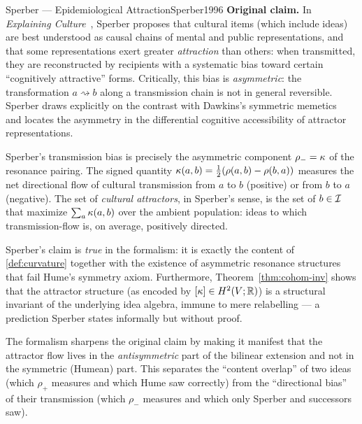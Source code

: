 \begin{zooentry}{Sperber --- Epidemiological Attraction}{Sperber1996}
\textbf{Original claim.} In \emph{Explaining Culture}~\cite{Sperber1996},
Sperber proposes that cultural items (which include ideas) are best
understood as causal chains of mental and public representations, and that
some representations exert greater \emph{attraction} than others: when
transmitted, they are reconstructed by recipients with a systematic bias
toward certain ``cognitively attractive'' forms. Critically, this bias is
\emph{asymmetric}: the transformation $a\rightsquigarrow b$ along a
transmission chain is not in general reversible. Sperber draws explicitly
on the contrast with Dawkins's symmetric memetics~\cite{Dawkins1976} and
locates the asymmetry in the differential cognitive accessibility of
attractor representations.

\formalclaim
Sperber's transmission bias is precisely the asymmetric component
$\rho_-=\kappa$ of the resonance pairing. The signed quantity
$\kappa(a,b)=\tfrac12(\rho(a,b)-\rho(b,a))$ measures the net directional
flow of cultural transmission from $a$ to $b$ (positive) or from $b$ to
$a$ (negative). The set of \emph{cultural attractors}, in Sperber's sense,
is the set of $b\in\mathcal{I}$ that maximize $\sum_a\kappa(a,b)$ over the
ambient population: ideas to which transmission-flow is, on average,
positively directed.

\formalstatus
Sperber's claim is \emph{true} in the formalism: it is exactly the
content of \cref{def:curvature} together with the existence of asymmetric
resonance structures that fail Hume's symmetry axiom. Furthermore,
Theorem~\ref{thm:cohom-inv} shows that the attractor structure (as
encoded by $[\kappa]\in H^2(V;\mathbb{R})$) is a structural invariant of the
underlying idea algebra, immune to mere relabelling --- a prediction
Sperber states informally but without proof.

\litcomment
The formalism sharpens the original claim by making it manifest that the
attractor flow lives in the \emph{antisymmetric} part of the bilinear
extension and not in the symmetric (Humean) part. This separates the
``content overlap'' of two ideas (which $\rho_+$ measures and which
Hume saw correctly) from the ``directional bias'' of their transmission
(which $\rho_-$ measures and which only Sperber and successors saw).
\end{zooentry}

